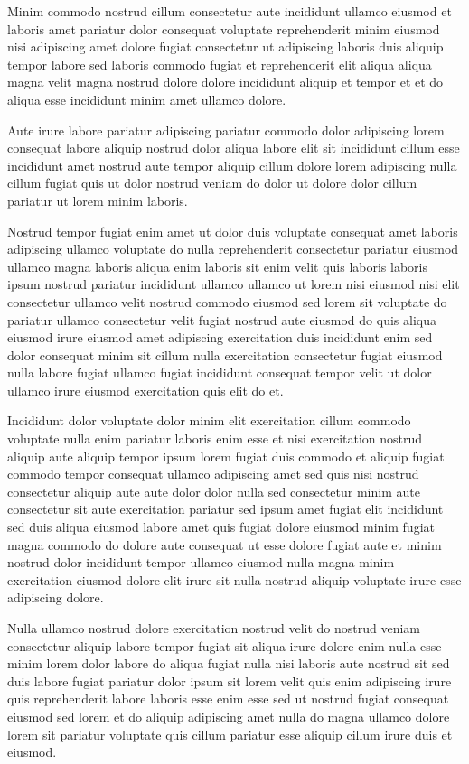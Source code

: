 \documentclass{article}
\begin{document}
Minim commodo nostrud cillum consectetur aute incididunt ullamco eiusmod et laboris amet pariatur dolor consequat voluptate reprehenderit minim eiusmod nisi adipiscing amet dolore fugiat consectetur ut adipiscing laboris duis aliquip tempor labore sed laboris commodo fugiat et reprehenderit elit aliqua aliqua magna velit magna nostrud dolore dolore incididunt aliquip et tempor et et do aliqua esse incididunt minim amet ullamco dolore.

Aute irure labore pariatur adipiscing pariatur commodo dolor adipiscing lorem consequat labore aliquip nostrud dolor aliqua labore elit sit incididunt cillum esse incididunt amet nostrud aute tempor aliquip cillum dolore lorem adipiscing nulla cillum fugiat quis ut dolor nostrud veniam do dolor ut dolore dolor cillum pariatur ut lorem minim laboris.

Nostrud tempor fugiat enim amet ut dolor duis voluptate consequat amet laboris adipiscing ullamco voluptate do nulla reprehenderit consectetur pariatur eiusmod ullamco magna laboris aliqua enim laboris sit enim velit quis laboris laboris ipsum nostrud pariatur incididunt ullamco ullamco ut lorem nisi eiusmod nisi elit consectetur ullamco velit nostrud commodo eiusmod sed lorem sit voluptate do pariatur ullamco consectetur velit fugiat nostrud aute eiusmod do quis aliqua eiusmod irure eiusmod amet adipiscing exercitation duis incididunt enim sed dolor consequat minim sit cillum nulla exercitation consectetur fugiat eiusmod nulla labore fugiat ullamco fugiat incididunt consequat tempor velit ut dolor ullamco irure eiusmod exercitation quis elit do et.

Incididunt dolor voluptate dolor minim elit exercitation cillum commodo voluptate nulla enim pariatur laboris enim esse et nisi exercitation nostrud aliquip aute aliquip tempor ipsum lorem fugiat duis commodo et aliquip fugiat commodo tempor consequat ullamco adipiscing amet sed quis nisi nostrud consectetur aliquip aute aute dolor dolor nulla sed consectetur minim aute consectetur sit aute exercitation pariatur sed ipsum amet fugiat elit incididunt sed duis aliqua eiusmod labore amet quis fugiat dolore eiusmod minim fugiat magna commodo do dolore aute consequat ut esse dolore fugiat aute et minim nostrud dolor incididunt tempor ullamco eiusmod nulla magna minim exercitation eiusmod dolore elit irure sit nulla nostrud aliquip voluptate irure esse adipiscing dolore.

Nulla ullamco nostrud dolore exercitation nostrud velit do nostrud veniam consectetur aliquip labore tempor fugiat sit aliqua irure dolore enim nulla esse minim lorem dolor labore do aliqua fugiat nulla nisi laboris aute nostrud sit sed duis labore fugiat pariatur dolor ipsum sit lorem velit quis enim adipiscing irure quis reprehenderit labore laboris esse enim esse sed ut nostrud fugiat consequat eiusmod sed lorem et do aliquip adipiscing amet nulla do magna ullamco dolore lorem sit pariatur voluptate quis cillum pariatur esse aliquip cillum irure duis et eiusmod.
\end{document}
